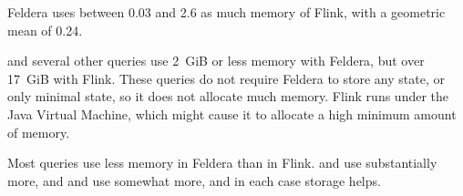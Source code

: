Feldera uses between 0.03\x{} and 2.6\x{} as much memory of Flink,
with a geometric mean of 0.24\x{}.

 and several other queries use 2~GiB or less memory with Feldera,
but over 17~GiB with Flink.  These queries do not require Feldera to
store any state, or only minimal state, so it does not allocate much
memory.  Flink runs under the Java Virtual Machine, which might cause
it to allocate a high minimum amount of memory.

Most queries use less memory in Feldera than in Flink.   and
 use substantially more, and  and 
use somewhat more, and in each case storage helps.
